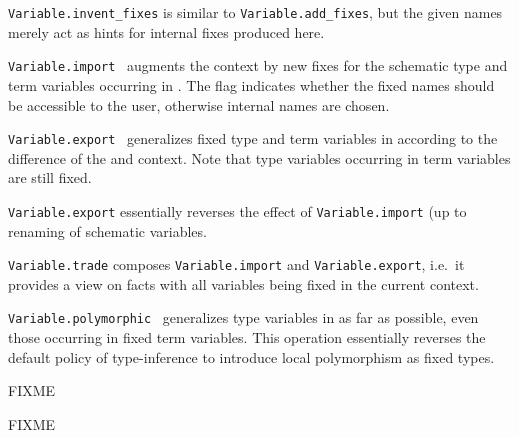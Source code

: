 \begin{isabellebody}
\begin{isamarkuptext}
\begin{description}
  \item \verb|Variable.invent_fixes| is similar to \verb|Variable.add_fixes|, but the given names merely act as hints for
  internal fixes produced here.

  \item \verb|Variable.import|~ augments the
  context by new fixes for the schematic type and term variables
  occurring in .  The  flag indicates
  whether the fixed names should be accessible to the user, otherwise
  internal names are chosen.

  \item \verb|Variable.export|~ generalizes
  fixed type and term variables in  according to the
  difference of the  and  context.  Note
  that type variables occurring in term variables are still fixed.

  \verb|Variable.export| essentially reverses the effect of \verb|Variable.import| (up to renaming of schematic variables.

  \item \verb|Variable.trade| composes \verb|Variable.import| and \verb|Variable.export|, i.e.\ it provides a view on facts with all
  variables being fixed in the current context.

  \item \verb|Variable.polymorphic|~ generalizes type
  variables in  as far as possible, even those occurring
  in fixed term variables.  This operation essentially reverses the
  default policy of type-inference to introduce local polymorphism as
  fixed types.

  \end{description}%
\end{isamarkuptext}%
\isamarkuptrue%
%
\endisatagmlref
{\isafoldmlref}%
%
\isadelimmlref
%
\endisadelimmlref
%
\begin{isamarkuptext}%
FIXME%
\end{isamarkuptext}%
\isamarkuptrue%
%
\isamarkuptrue%
%
\begin{isamarkuptext}%
FIXME



\end{isamarkuptext}
\end{isabellebody}
